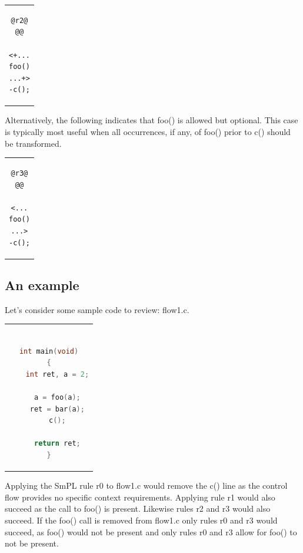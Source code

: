 \begin{center}
\begin{tabular}{c}
\begin{lstlisting}[language=Cocci]
@r2@
@@

<+...
foo()
...+>
-c();

\end{lstlisting}\\
\end{tabular}
\end{center}

Alternatively, the following indicates that foo() is allowed but optional.
This case is typically most useful when all occurrences, if any, of foo()
prior to c() should be transformed.

\begin{center}
\begin{tabular}{c}
\begin{lstlisting}[language=Cocci]
@r3@
@@

<...
foo()
...>
-c();

\end{lstlisting}\\
\end{tabular}
\end{center}

\subsection{An example}
Let's consider some sample code to review: flow1.c.

\begin{center}
\begin{tabular}{c}
\begin{lstlisting}[language=C]

int main(void)
{
	int ret, a = 2;

	a = foo(a);
	ret = bar(a);
	c();

	return ret;
}
\end{lstlisting}\\
\end{tabular}
\end{center}

Applying the SmPL rule r0 to flow1.c would remove the c() line as the control
flow provides no specific context requirements. Applying rule r1 would also
succeed as the call to foo() is present. Likewise rules r2 and r3 would also
succeed. If the foo() call is removed from flow1.c only rules r0 and r3 would
succeed, as foo() would not be present and only rules r0 and r3 allow for
foo() to not be present.

